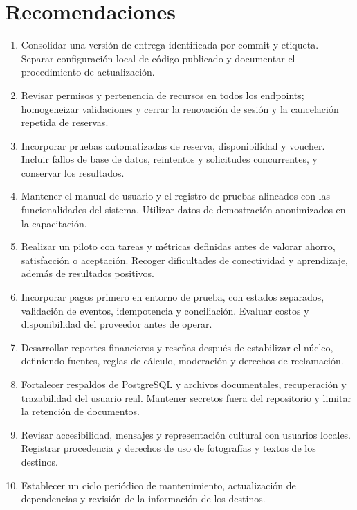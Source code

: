 \section{Recomendaciones}
\begin{enumerate}
\item Consolidar una versión de entrega identificada por commit y etiqueta. Separar configuración local de código publicado y documentar el procedimiento de actualización.
\item Revisar permisos y pertenencia de recursos en todos los endpoints; homogeneizar validaciones y cerrar la renovación de sesión y la cancelación repetida de reservas.
\item Incorporar pruebas automatizadas de reserva, disponibilidad y voucher. Incluir fallos de base de datos, reintentos y solicitudes concurrentes, y conservar los resultados.
\item Mantener el manual de usuario y el registro de pruebas alineados con las funcionalidades del sistema. Utilizar datos de demostración anonimizados en la capacitación.
\item Realizar un piloto con tareas y métricas definidas antes de valorar ahorro, satisfacción o aceptación. Recoger dificultades de conectividad y aprendizaje, además de resultados positivos.
\item Incorporar pagos primero en entorno de prueba, con estados separados, validación de eventos, idempotencia y conciliación. Evaluar costos y disponibilidad del proveedor antes de operar.
\item Desarrollar reportes financieros y reseñas después de estabilizar el núcleo, definiendo fuentes, reglas de cálculo, moderación y derechos de reclamación.
\item Fortalecer respaldos de PostgreSQL y archivos documentales, recuperación y trazabilidad del usuario real. Mantener secretos fuera del repositorio y limitar la retención de documentos.
\item Revisar accesibilidad, mensajes y representación cultural con usuarios locales. Registrar procedencia y derechos de uso de fotografías y textos de los destinos.
\item Establecer un ciclo periódico de mantenimiento, actualización de dependencias y revisión de la información de los destinos.
\end{enumerate}

